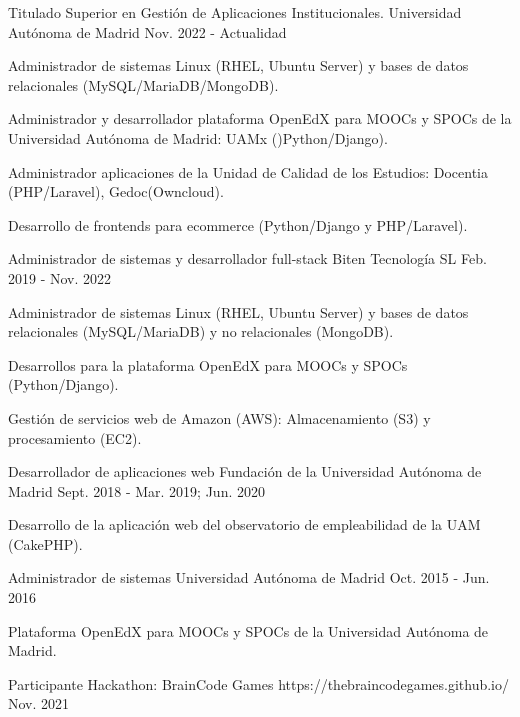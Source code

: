 \begin{cventries}
  \cventry
    {Titulado Superior en Gestión de Aplicaciones Institucionales.} %
    {Universidad Autónoma de Madrid} %
    {} %
    {Nov. 2022 - Actualidad} %
    {
      \begin{cvitems} %
        \item{Administrador de sistemas Linux (RHEL, Ubuntu Server) y bases de datos relacionales (MySQL/MariaDB/MongoDB).}
		\item{Administrador y desarrollador plataforma OpenEdX para MOOCs y SPOCs de la Universidad Autónoma de Madrid: UAMx ()Python/Django).}
		\item{Administrador aplicaciones de la Unidad de Calidad de los Estudios: Docentia (PHP/Laravel), Gedoc(Owncloud).}
		\item{Desarrollo de frontends para ecommerce (Python/Django y PHP/Laravel).}
      \end{cvitems}
    }

  \cventry
    {Administrador de sistemas y desarrollador full-stack} %
    {Biten Tecnología SL} %
    {} %
    {Feb. 2019 - Nov. 2022} %
    {
    \begin{cvitems}
      \item{Administrador de sistemas Linux (RHEL, Ubuntu Server) y bases de datos relacionales (MySQL/MariaDB) y no relacionales (MongoDB).}
		\item{Desarrollos para la plataforma OpenEdX para MOOCs y SPOCs (Python/Django).}
		\item{Gestión de servicios web de Amazon (AWS): Almacenamiento (S3) y procesamiento (EC2).}
	\end{cvitems}
	}

  \cventry
    {Desarrollador de aplicaciones web} %
    {Fundación de la Universidad Autónoma de Madrid} %
    {} %
    {Sept. 2018 - Mar. 2019; Jun. 2020} %
    {
      \begin{cvitems} %
        \item {Desarrollo de la aplicación web del observatorio de empleabilidad de la UAM (CakePHP).}
      \end{cvitems}
    }

  \cventry
    {Administrador de sistemas} %
    {Universidad Autónoma de Madrid} %
    {} %
    {Oct. 2015 - Jun. 2016} %
    {
      \begin{cvitems} %
        \item {Plataforma OpenEdX para MOOCs y SPOCs de la Universidad Autónoma de Madrid.}
      \end{cvitems}
    }
\end{cventries}

\begin{cventries}
  \cventry
    {Participante} %
    {Hackathon: BrainCode Games} %
    {https://thebraincodegames.github.io/} %
    {Nov. 2021} %
    {}
\end{cventries}